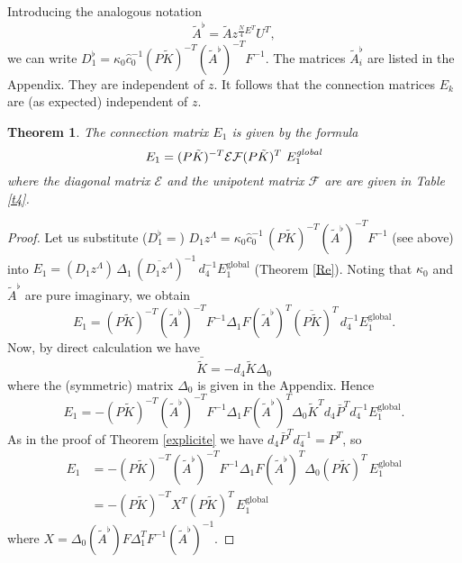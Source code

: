 \documentclass[a4paper,12pt,leqno]{amsart}
\numberwithin{equation}{section}
\theoremstyle{plain}
\newtheorem{theorem}{Theorem}[section]
\theoremstyle{definition}
\newcommand{\De}{\Delta}
\newcommand{\ka}{\kappa}
\newcommand{\MM}{\Lambda}
\begin{document}
{Introducing the analogous notation
\begin{equation}\label{Aflat}
\tilde A^\flat = \tilde A z^{\frac N4 E^T} U^T,
\end{equation}
we can write
$
D_1^\flat = \ka_0 \hat c_0^{-1} (P\tilde K)^{-T} (\tilde A^\flat)^{-T} F^{-1}.
$
The matrices $\tilde A_i^\flat$ are listed in the Appendix. They are independent of $z$. It follows that the connection matrices $E_k$ are (as expected) independent of $z$.

\begin{theorem}\label{Rexplicite}  
The connection matrix $E_1$ 
is given by the formula 
\[
E_1=
(P\tilde K)^{-T}
\mathcal E \mathcal F
(P\tilde K)^{T}
  \ 
 E_1^{\text{\em{global}}}
\]
where the diagonal matrix $\mathcal E$ and the unipotent matrix $\mathcal F$ are
are given in Table \ref{t4}.
\end{theorem}

\begin{proof} 
Let us substitute
($D_1^\flat=$)
$D_1z^\MM=\ka_0\hat c_0^{-1} \, (P\tilde K)^{-T} (\tilde A^\flat)^{-T}F^{-1}$ (see above) into 
$E_1= (D_1z^\MM)\, \De_1\, (\overline{D_1z^\MM})^{-1}\,d_4^{-1}E_1^{\text{global}}$
(Theorem \ref{Re}).  Noting that $\ka_0$ and $\tilde A^\flat$ are pure imaginary,
we obtain
\[
E_1= (P\tilde K)^{-T} (\tilde A^\flat)^{-T} F^{-1} 
\De_1
F  (\tilde A^\flat)^{T}
(\overline{P\tilde K})^{T}
\,d_4^{-1}E_1^{\text{global}}.
\]
Now, by direct calculation we have
\begin{equation}\label{Delta0}
\bar{\tilde K}  = -d_4 \tilde K  \De_0
\end{equation}
where the (symmetric) matrix $\De_0$ is given in the Appendix. Hence
\[
E_1= -(P\tilde K)^{-T} (\tilde A^\flat)^{-T} F^{-1} 
\De_1
F  (\tilde A^\flat)^T
\De_0 \tilde K^T d_4 \bar P^T d_4^{-1} E_1^{\text{global}}.
\]
As in the proof of Theorem \ref{explicite}
we have $d_4 \bar P^T d_4^{-1}=P^T$, so
\begin{align*}
E_1 &= 
-(P\tilde K)^{-T} (\tilde A^\flat)^{-T} F^{-1} 
\De_1
F  (\tilde A^\flat)^{T} \De_0
(P\tilde K)^{T}
\,
E_1^{\text{global}}
\\
&=
-(P \tilde K)^{-T} X^T (P \tilde K)^T \, E_1^{\text{global}}
\end{align*}
where $X=\De_0 (\tilde A^\flat) F \De_1^T F^{-1} (\tilde A^\flat)^{-1}$.


\end{proof}}
\end{document}

